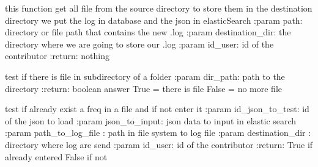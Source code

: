 \documentclass[letterpaper,10pt,english]{sphinxmanual}
\begin{document}
\begin{fulllineitems}
\label{\detokenize{QuChemPedIA.QuChemPedIA_lib:QuChemPedIA.QuChemPedIA_lib.import_file_lib.create_query}}
this function get all file from the source directory to store them in the destination directory
we put the log in database and the json in elasticSearch
:param path: directory or file path that contains the new .log
:param destination\_dir: the directory where we are going to store our .log
:param id\_user: id of the contributor
:return: nothing

\end{fulllineitems}


\begin{fulllineitems}
\label{\detokenize{QuChemPedIA.QuChemPedIA_lib:QuChemPedIA.QuChemPedIA_lib.import_file_lib.does_file_exist_in_dir}}
test if there is file in subdirectory of a folder
:param dir\_path: path to the directory
:return: boolean answer True = there is file False = no more file

\end{fulllineitems}


\begin{fulllineitems}
\label{\detokenize{QuChemPedIA.QuChemPedIA_lib:QuChemPedIA.QuChemPedIA_lib.import_file_lib.exist_freq}}
test if already exist a freq in a file and if not enter it
:param id\_json\_to\_test: id of the json to load
:param json\_to\_input: json data to input in elastic search
:param path\_to\_log\_file : path in file system to log file
:param destination\_dir : directory where log are send
:param id\_user: id of the contributor
:return: True if already entered False if not

\end{fulllineitems}
\end{document}
